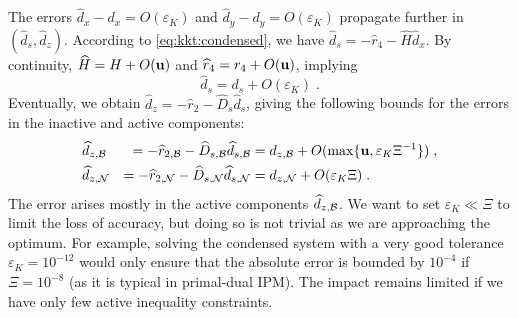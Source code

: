The errors $\widehat{d}_x - d_x = O(\varepsilon_K)$ and
$\widehat{d}_y - d_y = O(\varepsilon_K)$ propagate further in $(\widehat{d}_s, \widehat{d}_z)$.
According to \eqref{eq:kkt:condensed}, we have $\widehat{d}_s = - \widehat{r}_4 - \widehat{H} \widehat{d}_x$.
By continuity, $\widehat{H} = H + O(\mathbf{u})$ and $\widehat{r}_4 = r_4 + O(\mathbf{u})$, implying
\begin{equation}
  \widehat{d}_s = d_s + O(\varepsilon_K) \; .
\end{equation}
Eventually, we obtain $\widehat{d}_z = - \widehat{r}_2 - \widehat{D}_s \widehat{d}_s$,
giving the following bounds for the errors in the inactive and active components:
\begin{equation}
  \begin{aligned}
    & \widehat{d}_{z,\mathcal{B}} &= -\widehat{r}_{2,\mathcal{B}} - \widehat{D}_{s,\mathcal{B}} \widehat{d}_{s,\mathcal{B}}
    &= d_{z,\mathcal{B}} + O(\max\{\mathbf{u}, \varepsilon_K \Xi^{-1}\}) \;,\\
                             & \widehat{d}_{z,\mathcal{N}} &= -\widehat{r}_{2,\mathcal{N}} - \widehat{D}_{s,\mathcal{N}} \widehat{d}_{s,\mathcal{N}}
                               &= d_{z,\mathcal{N}} + O(\varepsilon_K \Xi) \; .
  \end{aligned}
\end{equation}
The error arises mostly in the active components $\widehat{d}_{z,\mathcal{B}}$.
We want to set $\varepsilon_K \ll \Xi$ to limit the loss of accuracy, but doing
so is not trivial as we are approaching the optimum. For example,
solving the condensed system with a very good tolerance $\varepsilon_K = 10^{-12}$
would only ensure that the absolute error is bounded by $10^{-4}$ if $\Xi = 10^{-8}$
(as it is typical in primal-dual IPM). The impact remains limited if we
have only few active inequality constraints.


